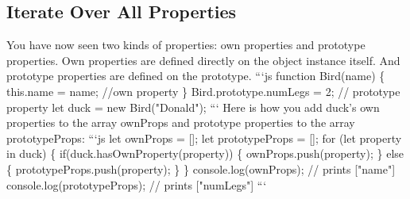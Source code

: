 \documentclass{article}%
\begin{document}
\subsection{Iterate Over All Properties}%
\label{subsec:IterateOverAllProperties}%
You have now seen two kinds of properties: own properties and prototype properties. Own properties are defined directly on the object instance itself. And prototype properties are defined on the prototype.\newline%
```js\newline%
function Bird(name) \{\newline%
  this.name = name;  //own property\newline%
\}\newline%
Bird.prototype.numLegs = 2; // prototype property\newline%
let duck = new Bird("Donald");\newline%
```\newline%
Here is how you add duck's own properties to the array ownProps and prototype properties to the array prototypeProps:\newline%
```js\newline%
let ownProps = {[}{]};\newline%
let prototypeProps = {[}{]};\newline%
for (let property in duck) \{\newline%
  if(duck.hasOwnProperty(property)) \{\newline%
    ownProps.push(property);\newline%
  \} else \{\newline%
    prototypeProps.push(property);\newline%
  \}\newline%
\}\newline%
console.log(ownProps); // prints {[}"name"{]}\newline%
console.log(prototypeProps); // prints {[}"numLegs"{]}\newline%
```\newline%

%
\end{document}
